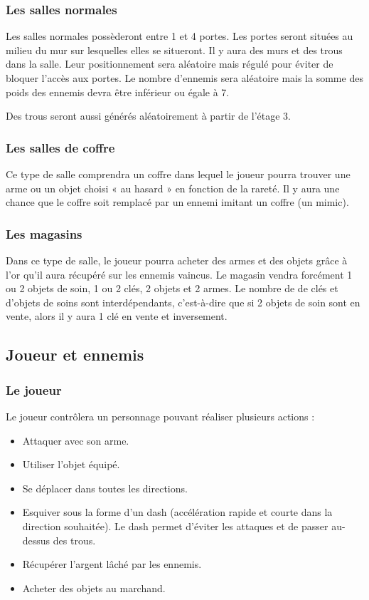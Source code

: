 \documentclass[]{extarticle}
\begin{document}
\newpage
		\subsubsection{Les salles normales}
\bigbreak
\bigbreak
Les salles normales possèderont entre 1 et 4 portes. Les portes seront situées au milieu du mur sur lesquelles elles se situeront. Il y aura des murs et des trous dans la salle. Leur positionnement sera aléatoire mais régulé pour éviter de bloquer l’accès aux portes. Le nombre d’ennemis sera aléatoire mais la somme des poids des ennemis devra être inférieur ou égale à 7.

Des trous seront aussi générés aléatoirement à partir de l'étage 3.
\bigbreak

		\subsubsection{Les salles de coffre}
\bigbreak
\bigbreak
Ce type de salle comprendra un coffre dans lequel le joueur pourra trouver une arme ou un objet choisi « au hasard » en fonction de la rareté. Il y aura une chance que le coffre soit remplacé par un ennemi imitant un coffre (un mimic).
\bigbreak

		\subsubsection{Les magasins}
\bigbreak
\bigbreak
Dans ce type de salle, le joueur pourra acheter des armes et des objets grâce à l’or qu’il aura récupéré sur les ennemis vaincus. Le magasin vendra forcément 1 ou 2 objets de soin, 1 ou 2 clés, 2 objets et 2 armes. Le nombre de de clés et d’objets de soins sont interdépendants, c’est-à-dire que si 2 objets de soin sont en vente, alors il y aura 1 clé en vente et inversement.
\bigbreak
	\subsection{Joueur et ennemis}
		\subsubsection{Le joueur}
		\bigbreak
		\bigbreak
Le joueur contrôlera un personnage pouvant réaliser plusieurs actions :
\begin{itemize}
\item Attaquer avec son arme.
\item Utiliser l’objet équipé.
\item Se déplacer dans toutes les directions.
\item Esquiver sous la forme d’un dash (accélération rapide et courte dans la direction souhaitée). Le dash permet d’éviter les attaques et de passer au-dessus des trous.
\item Récupérer l’argent lâché par les ennemis.
\item Acheter des objets au marchand.
\end{itemize}
\end{document}
